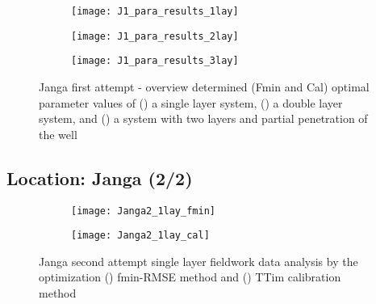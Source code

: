 \begin{figure}[h!]
	\centering
	\begin{subfigure}[b]{\linewidth}
		\centering\texttt{[image: J1\_para\_results\_1lay]}
		\captionsetup{justification=centering}		
		\caption{\label{fig:J1_para_results_1lay}}
		\end{subfigure}\vfill
	\begin{subfigure}[b]{\linewidth}
		\centering\texttt{[image: J1\_para\_results\_2lay]}
		\captionsetup{justification=centering}		
		\caption{\label{fig:J1_para_results_2lay}}
		\end{subfigure}
	\begin{subfigure}[b]{\linewidth}
		\centering\texttt{[image: J1\_para\_results\_3lay]}
		\captionsetup{justification=centering}		
		\caption{\label{fig:J1_para_results_3lay}}
		\end{subfigure}		
	\captionsetup{justification=centering}	
	\caption{Janga first attempt - overview determined (Fmin and Cal) optimal parameter values of () a single layer system, () a double layer system, and () a system with two layers and partial penetration of the well} 
	\label{fig:J1_para_results}
\end{figure} 

\clearpage\subsection{Location: Janga (2/2)}
\label{subsec:Janga2_overview}

\begin{figure}[h!]
	\centering
	\begin{subfigure}[b]{0.64\linewidth}
		\centering\texttt{[image: Janga2\_1lay\_fmin]}
		\captionsetup{justification=centering}		
		\caption{\label{fig:Janga2_1lay_fmin}}
		\end{subfigure}\vfill
	\begin{subfigure}[b]{0.64\linewidth}
		\centering\texttt{[image: Janga2\_1lay\_cal]}
		\captionsetup{justification=centering}		
		\caption{\label{fig:Janga2_1lay_cal}}
		\end{subfigure}
	\captionsetup{justification=centering}	
	\caption{Janga second attempt single layer fieldwork data analysis by the optimization () fmin-RMSE method and () TTim calibration method} 
	\label{fig:Janga2_1lay_analysis}
\end{figure} 

